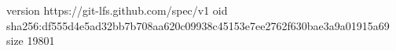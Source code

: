 version https://git-lfs.github.com/spec/v1
oid sha256:df555d4e5ad32bb7b708aa620c09938c45153e7ee2762f630bae3a9a01915a69
size 19801
